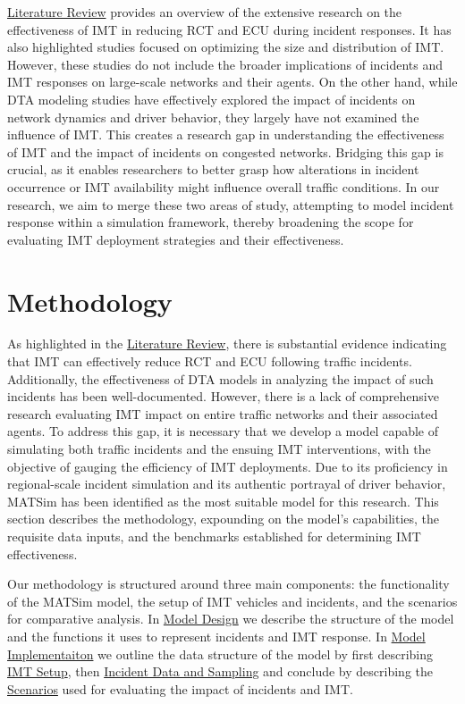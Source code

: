 \documentclass[fancy, oneside, mastersfancy, ms]{byuthesis}
\begin{document}
\protect\hyperlink{sec-literature}{Literature Review} provides an
overview of the extensive research on the effectiveness of IMT in
reducing RCT and ECU during incident responses. It has also highlighted
studies focused on optimizing the size and distribution of IMT. However,
these studies do not include the broader implications of incidents and
IMT responses on large-scale networks and their agents. On the other
hand, while DTA modeling studies have effectively explored the impact of
incidents on network dynamics and driver behavior, they largely have not
examined the influence of IMT. This creates a research gap in
understanding the effectiveness of IMT and the impact of incidents on
congested networks. Bridging this gap is crucial, as it enables
researchers to better grasp how alterations in incident occurrence or
IMT availability might influence overall traffic conditions. In our
research, we aim to merge these two areas of study, attempting to model
incident response within a simulation framework, thereby broadening the
scope for evaluating IMT deployment strategies and their effectiveness.


\hypertarget{sec-methods}{%
\chapter{Methodology}\label{sec-methods}}

As highlighted in the \protect\hyperlink{sec-literature}{Literature
Review}, there is substantial evidence indicating that IMT can
effectively reduce RCT and ECU following traffic incidents.
Additionally, the effectiveness of DTA models in analyzing the impact of
such incidents has been well-documented. However, there is a lack of
comprehensive research evaluating IMT impact on entire traffic networks
and their associated agents. To address this gap, it is necessary that
we develop a model capable of simulating both traffic incidents and the
ensuing IMT interventions, with the objective of gauging the efficiency
of IMT deployments. Due to its proficiency in regional-scale incident
simulation and its authentic portrayal of driver behavior, MATSim has
been identified as the most suitable model for this research. This
section describes the methodology, expounding on the model's
capabilities, the requisite data inputs, and the benchmarks established
for determining IMT effectiveness.

Our methodology is structured around three main components: the
functionality of the MATSim model, the setup of IMT vehicles and
incidents, and the scenarios for comparative analysis. In
\protect\hyperlink{sec-MATSim_mod}{Model Design} we describe the
structure of the model and the functions it uses to represent incidents
and IMT response. In \protect\hyperlink{sec-model_imp}{Model
Implementaiton} we outline the data structure of the model by first
describing \protect\hyperlink{sec-IMT_setup}{IMT Setup}, then
\protect\hyperlink{sec-inc_data}{Incident Data and Sampling} and
conclude by describing the \protect\hyperlink{sec-scenarios}{Scenarios}
used for evaluating the impact of incidents and IMT.
\end{document}
